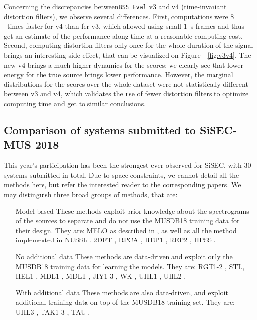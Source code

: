 \documentclass{llncs}
\begin{document}
Concerning the discrepancies between\texttt{BSS~Eval} v3 and v4 (time-invariant distortion filters), we observe several differences. First, computations were $8$~times faster for v4 than for v3, which allowed using small $1$~s frames and thus get an estimate of the performance along time at a reasonable computing cost. Second, computing distortion filters only once for the whole duration of the signal brings an interesting side-effect, that can be visualized on Figure~~\ref{fig:v3v4}. The new v4 brings a much higher dynamics for the scores: we clearly see that lower energy for the true source brings lower performance. However, the marginal distributions for the scores over the whole dataset were not statistically different between v3 and v4, which validates the use of fewer distortion filters to optimize computing time and get to similar conclusions.

\subsection{Comparison of systems submitted to SiSEC-MUS 2018}
This year's participation has been the strongest ever observed for SiSEC, with $30$ systems submitted in total. Due to space constraints, we cannot detail all the methods here, but refer the interested reader to the corresponding papers. We may distinguish three broad groups of methods, that are:
\begin{enumerate}
  \item[Model-based] These methods exploit prior knowledge about the spectrograms of the sources to separate and do not use the MUSDB18 training data for their design. They are: MELO as described in \cite{MELO}, as well as all the method implemented in NUSSL \cite{NUSSL}: 2DFT \cite{2DFT}, RPCA \cite{RPCA}, REP1 \cite{REP1}, REP2 \cite{REP2}, HPSS \cite{HPSS}.
  \item[No additional data] These methods are data-driven and exploit only the MUSDB18 training data for learning the models. They are: RGT1-2 \cite{RGT1}, STL, HEL1 \cite{HEL1}, MDL1 \cite{MDL1}, MDLT \cite{MDLT}, JIY1-3 \cite{JY1}, WK \cite{WK}, UHL1 \cite{UHL1}, UHL2 \cite{UHL2}.
  \item[With additional data] These methods are also data-driven, and exploit additional training data on top of the MUSDB18 training set. They are: UHL3 \cite{UHL2}, TAK1-3 \cite{TAK1}, TAU \cite{TAK1,UHL2}.
\end{enumerate}
\end{document}

